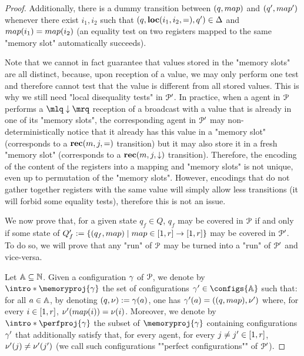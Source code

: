 \begin{proof}
	Additionally, there is a dummy transition between $(q,\map)$ and $(q',\map')$ whenever there exist $i_1, i_2$ such that $(q, \textbf{loc}(i_1,i_2,{=}), q') \in \Delta$ and $\map(i_1) = \map(i_2)$ (an equality test on two registers mapped to the same "memory slot" automatically succeeds).

	Note that we cannot in fact guarantee that values stored in the "memory slots" are all distinct, because, upon reception of a value, we may only perform one test and therefore cannot test that the value is different from all stored values. This is why we still need "local disequality tests" in $\mathcal{P}'$. In practice, when a agent in $\mathcal{P}$ performs a $\quotemarks{\enregact}$ reception of a broadcast with a value that is already in one of its "memory slots", the corresponding agent in $\mathcal{P}'$ may non-deterministically notice that it already has this value in a "memory slot" (corresponds to a $\textbf{rec}(m, j, {=})$ transition) but it may also store it in a fresh "memory slot" (corresponds to a $\textbf{rec}(m, j, \downarrow)$ transition). Therefore, the encoding of the content of the registers into a mapping and "memory slots" is not unique, even up to permutation of the "memory slots". However, encodings that do not gather together registers with the same value will simply allow less transitions (it will forbid some equality tests), therefore this is not an issue. 

	We now prove that, for a given state $q_f \in Q$, $q_f$ may be covered in $\mathcal{P}$ if and only if some state of $Q_f' := \set{(q_f, \map) \mid \map \in \nset{1}{r} \to \nset{1}{r}}$ may be covered in $\mathcal{P}'$. To do so, we will prove that any "run" of $\mathcal{P}$ may be turned into a "run" of $\mathcal{P}'$ and vice-versa. 
  
	Let $\mathbb{A} \subseteq \mathbb{N}$.
	Given a configuration $\gamma$ of $\mathcal{P}$, we denote by \AP $\intro*\memoryproj{\config}$ 
	the set of configurations $\config' \in \configs{\agents}$ such that:
	 for all $a \in \mathbb{A}$, by denoting $(q, \nu):= \gamma(a)$, one has $\config'(a) = ((q, \map), \localdata')$ where, for every $i \in [1,r]$, $\localdata'(\map(i)) = \localdata(i)$. 
	Moreover, we denote by $\intro*\perfproj{\config}$ 
	the subset of $\memoryproj{\config}$ containing configurations 
	$\gamma'$ that additionally satisfy that, for every agent, for every $j \ne j' \in [1,r]$, $\nu'(j) \ne \nu'(j')$ (we call such configurations ""perfect configurations"" of $\mathcal{P}'$).


\end{proof}
